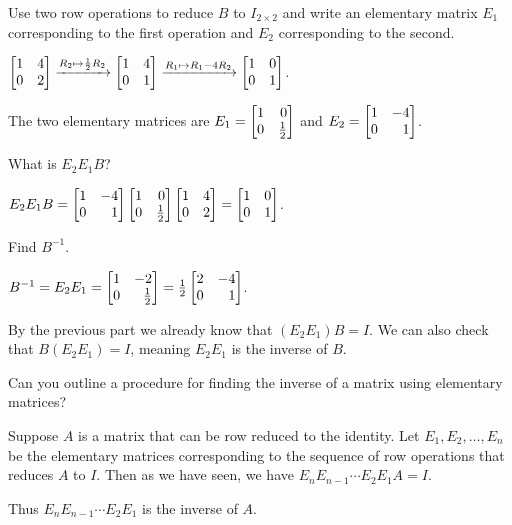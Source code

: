 \documentclass{problemset}
\begin{document}
	\begin{parts}
		\item Use two row operations to reduce $B$ to $I_{2\times 2}$ and write
			an elementary matrix $E_1$ corresponding to the first operation and
			$E_2$ corresponding to the second.
			\begin{solution}
				$\mat{1&4\\0&2}\xrightarrow{R_2\mapsto \frac{1}{2}R_2}\mat{1&4\\0&1}
				\xrightarrow{R_1\mapsto R_1-4R_2}\mat{1&0\\0&1}$.

				The two elementary matrices are $E_1=\mat{1&0\\0&\frac{1}{2}}$
				and $E_2=\mat{1&-4\\0&1}$.
			\end{solution}
		\item What is $E_2E_1B$?
			\begin{solution}
				$E_2E_1B=\mat{1&-4\\0&1}\mat{1&0\\0&\frac{1}{2}}\mat{1 &4\\0 &2}=\mat{1&0\\0&1}$.
			\end{solution}
		\item Find $B^{-1}$.
			\begin{solution}
				$B^{-1}=E_2E_1=\mat{1&-2\\0&\frac{1}{2}}=\frac{1}{2}\mat{2&-4\\0&1}$.

				By the previous part we already know that $(E_2E_1)B=I$. We can also
				check that $B(E_2E_1)=I$, meaning $E_2E_1$ is the inverse of $B$.
			\end{solution}
		\item Can you outline a procedure for finding the inverse of a matrix
		using elementary matrices?
			\begin{solution}
				Suppose $A$ is a matrix that can be row reduced to the identity.
				Let $E_1, E_2, \dots, E_n$ be the elementary matrices corresponding
				to the sequence of row operations that reduces $A$ to $I$. Then
				as we have seen, we have $E_n E_{n-1} \cdots E_2 E_1 A = I$.

				Thus $E_n E_{n-1} \cdots E_2 E_1$ is the inverse of $A$.
			\end{solution}
	\end{parts}
\end{document}

